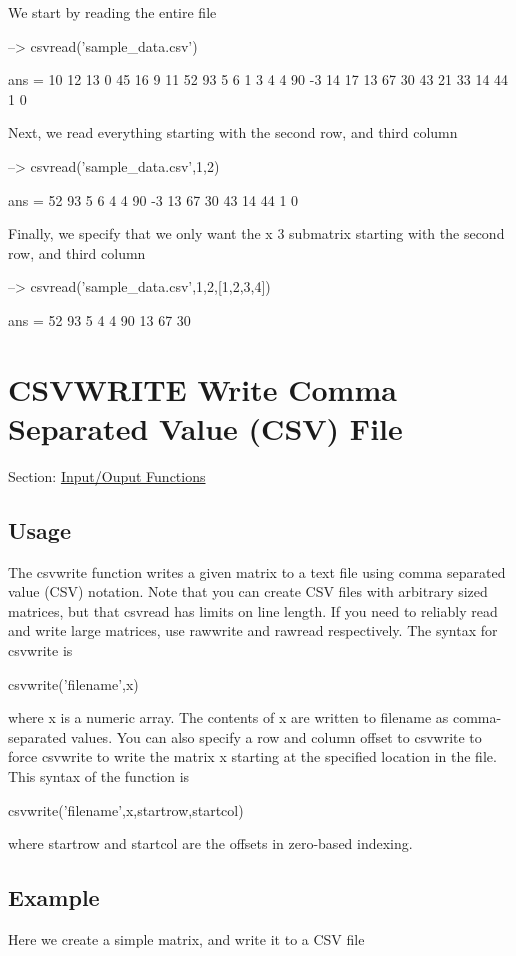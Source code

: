 We start by reading the entire file


\begin{DoxyVerbInclude}
--> csvread('sample_data.csv')

ans = 
 10 12 13  0 45 16 
  9 11 52 93  5  6 
  1  3  4  4 90 -3 
 14 17 13 67 30 43 
 21 33 14 44  1  0 
\end{DoxyVerbInclude}


Next, we read everything starting with the second row, and third column


\begin{DoxyVerbInclude}
--> csvread('sample_data.csv',1,2)

ans = 
 52 93  5  6 
  4  4 90 -3 
 13 67 30 43 
 14 44  1  0 
\end{DoxyVerbInclude}


Finally, we specify that we only want the { x 3} submatrix starting with the second row, and third column


\begin{DoxyVerbInclude}
--> csvread('sample_data.csv',1,2,[1,2,3,4])

ans = 
 52 93  5 
  4  4 90 
 13 67 30 
\end{DoxyVerbInclude}
 \hypertarget{io_csvwrite}{}\section{C\-S\-V\-W\-R\-I\-T\-E Write Comma Separated Value (C\-S\-V) File}\label{io_csvwrite}
Section\-: \hyperlink{sec_io}{Input/\-Ouput Functions} \hypertarget{vtkwidgets_vtkxyplotwidget_Usage}{}\subsection{Usage}\label{vtkwidgets_vtkxyplotwidget_Usage}
The {\ttfamily csvwrite} function writes a given matrix to a text file using comma separated value (C\-S\-V) notation. Note that you can create C\-S\-V files with arbitrary sized matrices, but that {\ttfamily csvread} has limits on line length. If you need to reliably read and write large matrices, use {\ttfamily rawwrite} and {\ttfamily rawread} respectively. The syntax for {\ttfamily csvwrite} is \begin{DoxyVerb}   csvwrite('filename',x)
\end{DoxyVerb}
 where {\ttfamily x} is a numeric array. The contents of {\ttfamily x} are written to {\ttfamily filename} as comma-\/separated values. You can also specify a row and column offset to {\ttfamily csvwrite} to force {\ttfamily csvwrite} to write the matrix {\ttfamily x} starting at the specified location in the file. This syntax of the function is \begin{DoxyVerb}   csvwrite('filename',x,startrow,startcol)
\end{DoxyVerb}
 where {\ttfamily startrow} and {\ttfamily startcol} are the offsets in zero-\/based indexing. \hypertarget{variables_struct_Example}{}\subsection{Example}\label{variables_struct_Example}
Here we create a simple matrix, and write it to a C\-S\-V file


